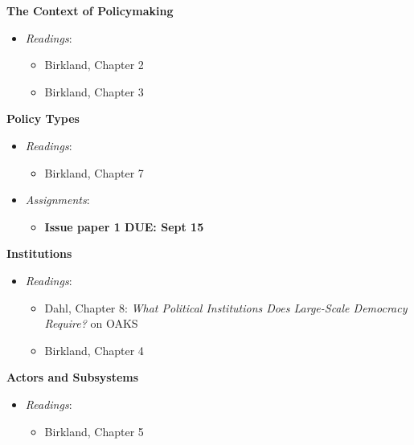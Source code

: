 \week \textbf{The Context of Policymaking}

\begin{itemize}

\item
  \emph{Readings}:

  \begin{itemize}
  
  \item
    Birkland, Chapter 2
  \item
    Birkland, Chapter 3
  \end{itemize}
\end{itemize}

\week \textbf{Policy Types}

\begin{itemize}

\item
  \emph{Readings}:

  \begin{itemize}
  
  \item
    Birkland, Chapter 7
  \end{itemize}
\item
  \emph{Assignments}:

  \begin{itemize}
  
  \item
    \textbf{Issue paper 1 DUE: Sept 15}
  \end{itemize}
\end{itemize}

\week \textbf{Institutions}

\begin{itemize}

\item
  \emph{Readings}:

  \begin{itemize}
  
  \item Dahl, Chapter 8: \emph{What Political Institutions
  Does Large-Scale Democracy Require?} on OAKS
  \item
    Birkland, Chapter 4
  \end{itemize}
\end{itemize}

\week \textbf{Actors and Subsystems}

\begin{itemize}

\item
  \emph{Readings}:

  \begin{itemize}
  
  \item
    Birkland, Chapter 5
  \end{itemize}
\end{itemize}

